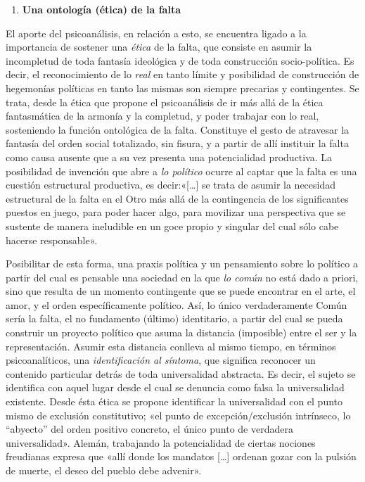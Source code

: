 \begin{enumerate}
\def\labelenumi{\arabic{enumi}.}
\item
  \textbf{Una ontología (ética) de la falta}
\end{enumerate}

El aporte del psicoanálisis, en relación a esto, se encuentra ligado a la importancia de sostener una \emph{ética} de la falta, que consiste en asumir la incompletud de toda fantasía ideológica y de toda construcción socio-política. Es decir, el reconocimiento de lo \emph{real }en tanto límite y posibilidad de construcción de hegemonías políticas en tanto las mismas son siempre precarias y contingentes. Se trata, desde la ética que propone el psicoanálisis de ir más allá de la ética fantasmática de la armonía y la completud, y poder trabajar con lo real, sosteniendo la función ontológica de la falta. Constituye el gesto de atravesar la fantasía del orden social totalizado, sin fisura, y a partir de allí instituir la falta como causa ausente que a su vez presenta una potencialidad productiva. La posibilidad de invención que abre a \emph{lo político} ocurre al captar que la falta es una cuestión estructural productiva, es decir:«{[}\ldots{]} se trata de asumir la necesidad estructural de la falta en el Otro más allá de la contingencia de los significantes puestos en juego, para poder hacer algo, para movilizar una perspectiva que se sustente de manera ineludible en un goce propio y singular del cual sólo cabe hacerse responsable».

Posibilitar de esta forma, una praxis política y un pensamiento sobre lo político a partir del cual es pensable una sociedad en la que \emph{lo común} no está dado a priori, sino que resulta de un momento contingente que se puede encontrar en el arte, el amor, y el orden específicamente político. Así, lo único verdaderamente Común sería la falta, el no fundamento (último) identitario, a partir del cual se pueda construir un proyecto político que asuma la distancia (imposible) entre el ser y la representación. Asumir esta distancia conlleva al mismo tiempo, en términos psicoanalíticos, una \emph{identificación al síntoma}, que significa reconocer un contenido particular detrás de toda universalidad abstracta. Es decir, el sujeto se identifica con aquel lugar desde el cual se denuncia como falsa la universalidad existente. Desde ésta ética se propone identificar la universalidad con el punto mismo de exclusión constitutivo; «el punto de excepción/exclusión intrínseco, lo ``abyecto'' del orden positivo concreto, el único punto de verdadera universalidad». Alemán, trabajando la potencialidad de ciertas nociones freudianas expresa que «allí donde los mandatos {[}\ldots{]} ordenan gozar con la pulsión de muerte, el deseo del pueblo debe advenir».

